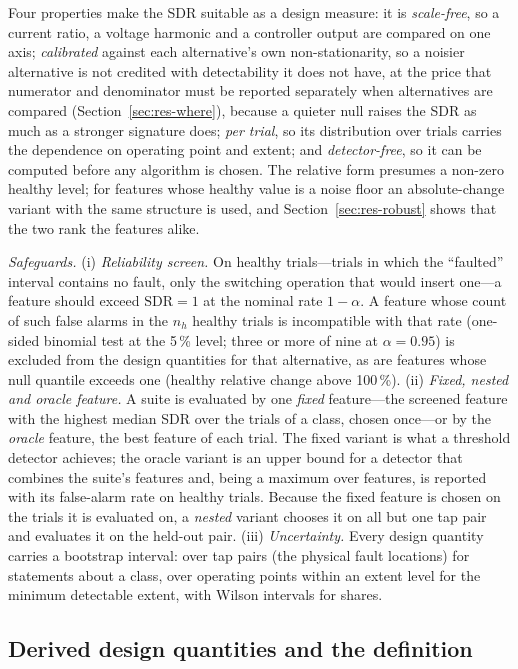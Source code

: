 Four properties make the SDR suitable as a design measure: it is \emph{scale-free}, so a current ratio, a voltage harmonic and a controller output are compared on one axis; \emph{calibrated} against each alternative's own non-stationarity, so a noisier alternative is not credited with detectability it does not have, at the price that numerator and denominator must be reported separately when alternatives are compared (Section~\ref{sec:res-where}), because a quieter null raises the SDR as much as a stronger signature does; \emph{per trial}, so its distribution over trials carries the dependence on operating point and extent; and \emph{detector-free}, so it can be computed before any algorithm is chosen. The relative form presumes a non-zero healthy level; for features whose healthy value is a noise floor an absolute-change variant with the same structure is used, and Section~\ref{sec:res-robust} shows that the two rank the features alike.

\emph{Safeguards.} (i) \emph{Reliability screen.} On healthy trials---trials in which the ``faulted'' interval contains no fault, only the switching operation that would insert one---a feature should exceed $\mathrm{SDR}=1$ at the nominal rate $1-\alpha$. A feature whose count of such false alarms in the $n_h$ healthy trials is incompatible with that rate (one-sided binomial test at the 5\,\% level; three or more of nine at $\alpha=0.95$) is excluded from the design quantities for that alternative, as are features whose null quantile exceeds one (healthy relative change above 100\,\%). (ii) \emph{Fixed, nested and oracle feature.} A suite is evaluated by one \emph{fixed} feature---the screened feature with the highest median SDR over the trials of a class, chosen once---or by the \emph{oracle} feature, the best feature of each trial. The fixed variant is what a threshold detector achieves; the oracle variant is an upper bound for a detector that combines the suite's features and, being a maximum over features, is reported with its false-alarm rate on healthy trials. Because the fixed feature is chosen on the trials it is evaluated on, a \emph{nested} variant chooses it on all but one tap pair and evaluates it on the held-out pair. (iii) \emph{Uncertainty.} Every design quantity carries a bootstrap interval: over tap pairs (the physical fault locations) for statements about a class, over operating points within an extent level for the minimum detectable extent, with Wilson intervals for shares.

\subsection{Derived design quantities and the definition}\label{sec:derived}

